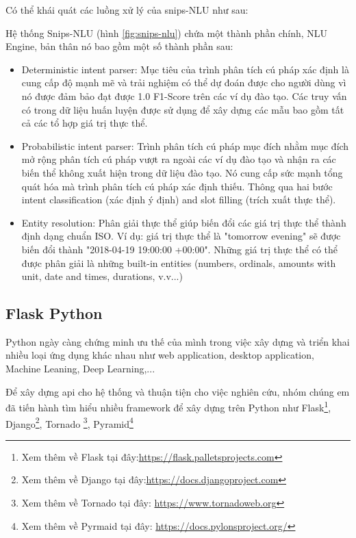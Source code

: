 Có thể khái quát các luồng xử lý của snips-NLU \cite{snips-nlu} như sau:

Hệ thống Snips-NLU (hình \ref{fig:snips-nlu}) chứa một thành phần chính, NLU Engine, bản thân nó bao gồm một số thành phần sau:
\begin{itemize}
    \item Deterministic intent parser: Mục tiêu của trình phân tích cú pháp xác định là cung cấp độ mạnh mẽ và trải nghiệm có thể dự đoán được cho người dùng vì nó được đảm bảo đạt được 1.0 F1-Score trên các ví dụ đào tạo. Các truy vấn có trong dữ liệu huấn luyện được sử dụng để xây dựng các mẫu bao gồm tất cả các tổ hợp giá trị thực thể.
    \item Probabilistic intent parser: Trình phân tích cú pháp mục đích nhằm mục đích mở rộng phân tích cú pháp vượt ra ngoài các ví dụ đào tạo và nhận ra các biến thể không xuất hiện trong dữ liệu đào tạo. Nó cung cấp sức mạnh tổng quát hóa mà trình phân tích cú pháp xác định thiếu. Thông qua hai bước intent classification (xác định ý định) and slot filling (trích xuất thực thể).
    \item Entity resolution: Phân giải thực thể giúp biến đổi các giá trị thực thể thành định dạng chuẩn ISO. Ví dụ: giá trị thực thể là "tomorrow evening" sẽ được biến đổi thành "2018-04-19 19:00:00 +00:00". Những giá trị thực thể có thể được phân giải là những built-in entities (numbers, ordinals, amounts with unit, date and times, durations, v.v...)
\end{itemize}

\subsection{Flask Python}
Python ngày càng chứng minh ưu thế của mình trong việc xây dựng và triển khai nhiều loại ứng dụng khác nhau như web application, desktop application, Machine Leaning, Deep Learning,...

Để xây dựng \ac{api} cho hệ thống và thuận tiện cho việc nghiên cứu, nhóm chúng em đã tiến hành tìm hiểu nhiều framework để xây dựng trên Python như Flask\footnote{Xem thêm về Flask tại đây:\url{https://flask.palletsprojects.com}}, Django\footnote{Xem thêm về Django tại đây:\url{https://docs.djangoproject.com}}, Tornado \footnote{Xem thêm về Tornado tại đây: \url{https://www.tornadoweb.org}}, Pyramid\footnote{Xem thêm về Pyrmaid tại đây: \url{https://docs.pylonsproject.org/}}

